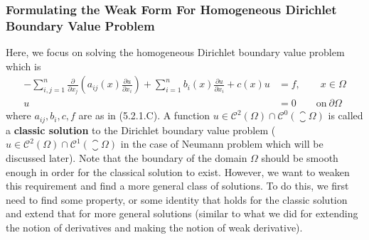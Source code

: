 \subsubsection{Formulating the Weak Form For Homogeneous Dirichlet Boundary Value Problem }
Here, we focus on solving the homogeneous Dirichlet boundary value problem which is
\begin{align*}
	-\sum_{i,j=1}^{n}\frac{\partial}{\partial x_j}(a_{ij}(x) \frac{\partial u}{\partial x_i}) + \sum_{i=1}^{n}b_i(x) \frac{\partial u}{\partial x_i} + c(x) u &= f, \qquad x \in \Omega \\
	u &= 0 \qquad \text{on}\ \partial \Omega \tag{5.2.$\clubsuit$}
\end{align*}
where $ a_{ij}, b_i, c, f $ are as in (5.2.1.C). A function $ u \in \mathscr{C}^2(\Omega) \cap \mathscr{C}^0(\closure{\Omega}) $ is called a \textbf{classic solution} to the Dirichlet boundary value problem ($ u \in \mathscr{C}^2(\Omega)\cap \mathscr{C}^1(\closure{\Omega}) $ in the case of Neumann problem which will be discussed later). Note that the boundary of the domain $ \Omega $ should be smooth enough in order for the classical solution to exist. However, we want to weaken this requirement and find a more general class of solutions. To do this, we first need to find some property, or some identity that holds for the classic solution and extend that for more general solutions (similar to what we did for extending the notion of derivatives and making the notion of weak derivative). 

